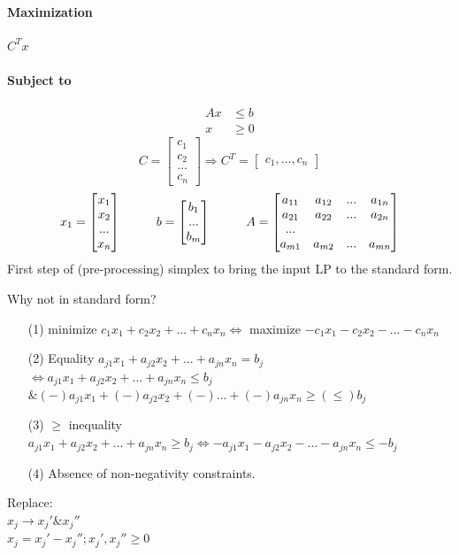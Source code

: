 \paragraph{Maximization} $C^Tx$
\paragraph{Subject to} \begin{align*}
	Ax &\leq b \\
	x & \geq 0
\end{align*}
$$C = \begin{bmatrix}
c_1 \\ c_2 \\ ... \\ c_n
\end{bmatrix} \Rightarrow C^T = \begin{bmatrix}
c_1,...,c_n
\end{bmatrix}$$
$$x_1 = \begin{bmatrix}
x_1 \\ x_2 \\ ... \\ x_n
\end{bmatrix} \hspace*{1cm} b = \begin{bmatrix}
b_1 \\ ... \\ b_m
\end{bmatrix} \hspace{1cm} A = \begin{bmatrix}
a_{11} & a_{12} & ... & a_{1n} \\
a_{21} & a_{22} & ... & a_{2n} \\
... \\
a_{m1} & a_{m2} & ... & a_{mn} 
\end{bmatrix}$$
First step of (pre-processing) simplex to bring the input LP to the standard form.

Why not in standard form?
\begin{itemize}
\item[(1)] minimize $c_1x_1+c_2x_2+...+c_nx_n \Leftrightarrow$ maximize $-c_1x_1-c_2x_2-...-c_nx_n$
\item[(2)] Equality $a_{j1}x_1 + a_{j2}x_2 + ... + a_{jn}x_n = b_j$ \\ $\Leftrightarrow a_{j1}x_1 + a_{j2}x_2 + ... + a_{jn}x_n \leq b_j$ \\
$\& (-) a_{j1}x_1 +(-) a_{j2}x_2 +(-) ... +(-) a_{jn}x_n \geq (\leq) b_j$
\item[(3)] $\geq$ inequality $a_{j1}x_1 + a_{j2}x_2 + ... + a_{jn}x_n \geq b_j \Leftrightarrow -a_{j1}x_1 - a_{j2}x_2 - ... - a_{jn}x_n \leq -b_j$
\item[(4)] Absence of non-negativity constraints.
\end{itemize}
Replace: \\ 
$x_j \rightarrow x_j' \& x_j''$ \\
$x_j = x_j'-x_j'';x_j',x_j'' \geq 0$
